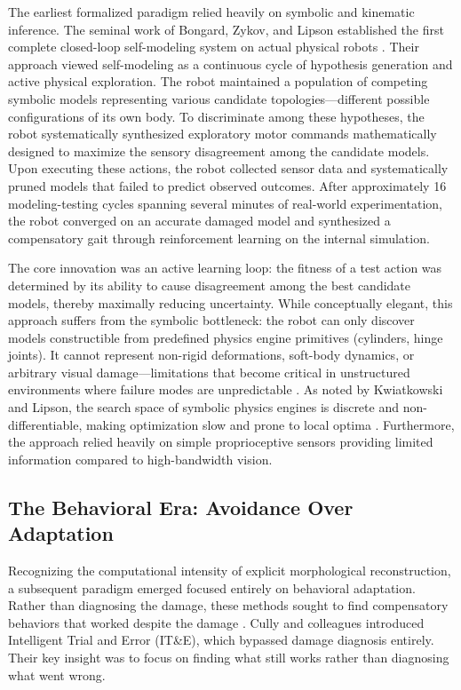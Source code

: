 \documentclass[12pt,a4paper,oneside]{report}
\begin{document}
The earliest formalized paradigm relied heavily on symbolic and kinematic inference. The seminal work of Bongard, Zykov, and Lipson established the first complete closed-loop self-modeling system on actual physical robots \cite{bongard2006resilient}. Their approach viewed self-modeling as a continuous cycle of hypothesis generation and active physical exploration. The robot maintained a population of competing symbolic models representing various candidate topologies—different possible configurations of its own body. To discriminate among these hypotheses, the robot systematically synthesized exploratory motor commands mathematically designed to maximize the sensory disagreement among the candidate models. Upon executing these actions, the robot collected sensor data and systematically pruned models that failed to predict observed outcomes. After approximately 16 modeling-testing cycles spanning several minutes of real-world experimentation, the robot converged on an accurate damaged model and synthesized a compensatory gait through reinforcement learning on the internal simulation.

The core innovation was an active learning loop: the fitness of a test action was determined by its ability to cause disagreement among the best candidate models, thereby maximally reducing uncertainty. While conceptually elegant, this approach suffers from the symbolic bottleneck: the robot can only discover models constructible from predefined physics engine primitives (cylinders, hinge joints). It cannot represent non-rigid deformations, soft-body dynamics, or arbitrary visual damage—limitations that become critical in unstructured environments where failure modes are unpredictable \cite{kwiatkowski2019task}. As noted by Kwiatkowski and Lipson, the search space of symbolic physics engines is discrete and non-differentiable, making optimization slow and prone to local optima \cite{kwiatkowski2019task}. Furthermore, the approach relied heavily on simple proprioceptive sensors providing limited information compared to high-bandwidth vision.

\subsection{The Behavioral Era: Avoidance Over Adaptation}
\label{subsec:behavioral_era}

Recognizing the computational intensity of explicit morphological reconstruction, a subsequent paradigm emerged focused entirely on behavioral adaptation. Rather than diagnosing the damage, these methods sought to find compensatory behaviors that worked despite the damage \cite{cully2015robots}. Cully and colleagues introduced Intelligent Trial and Error (IT\&E), which bypassed damage diagnosis entirely. Their key insight was to focus on finding what still works rather than diagnosing what went wrong.
\end{document}
